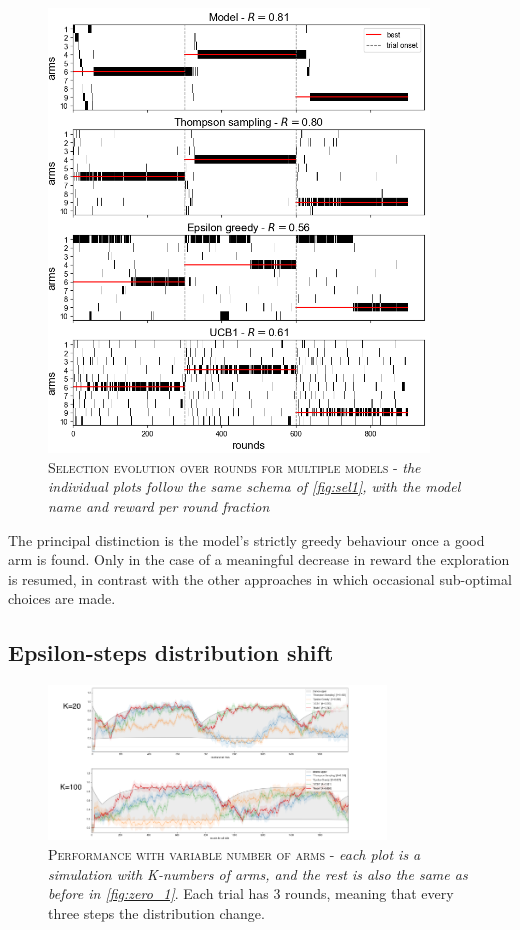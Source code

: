 \begin{figure}[ht]
    \centering
    \includegraphics[width=0.9\textwidth]{figures/selections_many.png}
    \caption{\textsc{Selection evolution over rounds for multiple models} - \textit{the individual plots follow the same schema of \ref{fig:sel1}, with the model name and reward per round fraction}}
    \label{fig:sel2}
\end{figure}

\noindent The principal distinction is the model's strictly greedy behaviour once a good arm is found. Only in the case of a meaningful decrease in reward the exploration is resumed, in contrast with the other approaches in which occasional sub-optimal choices are made.


\subsection{Epsilon-steps distribution shift}

\begin{figure}[ht]
    \centering
    \includegraphics[width=0.8\textwidth]{figures/drawing2.png}
    \caption{\textsc{Performance with variable number of arms} - \textit{each plot is a simulation with K-numbers of arms, and the rest is also the same as before in \ref{fig:zero_1}}. Each trial has 3 rounds, meaning that every three steps the distribution change.}
    \label{fig:eps_1}
\end{figure}

